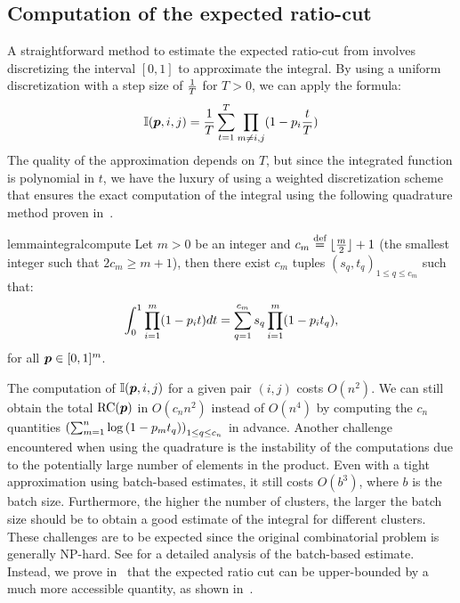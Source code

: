 \subsection{Computation of the expected ratio-cut}\label{subsec:computeall}
A straightforward method to estimate the expected ratio-cut from
 involves discretizing the interval $[0,1]$ to approximate
the integral. By using a uniform discretization with a step size of ${\frac{1}{T}}$ for
$T>0$, we can apply the formula:
\[
	{\mathbb{I}}({\bm{p}}, i, j) = {\frac{1}{T}} \sum_{t=1}^{T} \prod_{m\neq i,j} (1-{p}_i \frac{t}{T})
\]
The quality of the approximation depends on $T$, but since the integrated
  function is polynomial in $t$, we have the luxury of using a weighted
  discretization scheme that ensures the exact computation of the integral using
  the following quadrature method proven in~.

\begin{restatable}{lemma}{integralcompute}
	\label{lemma:integralcompute}
	Let $m>0$ be an integer and $c_m \stackrel{\text{def}}{=} \lfloor\frac{m}{2}\rfloor + 1$ (the
	smallest integer such that $2c_m\geq m+1$), then there exist $c_m$ tuples
	$(s_q,t_q)_{1\leq q \leq c_m}$ such that:
	\[
		\int_{0}^{1} \prod_{i=1}^{m} (1-{p}_i t)dt = \sum_{q=1}^{c_m} s_q \prod_{i=1}^{m} (1-{p}_i t_q),
	\]
	for all ${\bm{p}}\in [0,1]^m$.
\end{restatable}

The computation of ${\mathbb{I}}({\bm{p}}, i,j)$ for a given pair $(i,j)$ costs $O(n^2)$. We can
still obtain the total $\operatorname*{RC}({\bm{p}})$ in $O(c_n n^2)$ instead of $O(n^4)$ by computing
the $c_n$ quantities $\left(\sum_{m=1}^n\log\left(1-{p}_{m} t_q\right)\right)_{1\leq
q\leq c_n}$ in advance. Another challenge encountered when using the quadrature is
the instability of the computations due to the potentially large number of elements
in the product. Even with a tight approximation using batch-based estimates, it
still costs $O(b^3)$, where $b$ is the batch size. Furthermore, the higher the
number of clusters, the larger the batch size should be to obtain a good estimate
of the integral for different clusters. These challenges are to be expected since
the original combinatorial problem is generally NP-hard. See
 for a detailed analysis of the batch-based estimate.
Instead, we prove in~ that the expected ratio cut
can be upper-bounded by a much more accessible quantity, as shown
in~.

